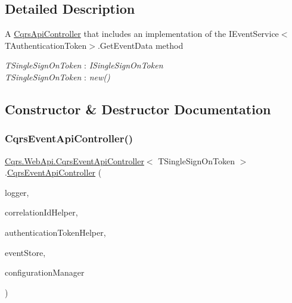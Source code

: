 \subsection{Detailed Description}
A \hyperlink{classCqrs_1_1WebApi_1_1CqrsApiController}{Cqrs\+Api\+Controller} that includes an implementation of the I\+Event\+Service$<$\+T\+Authentication\+Token$>$.\+Get\+Event\+Data method 

\begin{Desc}
\item[Type Constraints]\begin{description}
\item[{\em T\+Single\+Sign\+On\+Token} : {\em I\+Single\+Sign\+On\+Token}]\item[{\em T\+Single\+Sign\+On\+Token} : {\em new()}]\end{description}
\end{Desc}


\subsection{Constructor \& Destructor Documentation}
\mbox{\label{classCqrs_1_1WebApi_1_1CqrsEventApiController_a5f1162d692213363fdcaf898f439f7dd_a5f1162d692213363fdcaf898f439f7dd}} 
\subsubsection{\texorpdfstring{Cqrs\+Event\+Api\+Controller()}{CqrsEventApiController()}}
{\footnotesize\ttfamily \hyperlink{classCqrs_1_1WebApi_1_1CqrsEventApiController}{Cqrs.\+Web\+Api.\+Cqrs\+Event\+Api\+Controller}$<$ T\+Single\+Sign\+On\+Token $>$.\hyperlink{classCqrs_1_1WebApi_1_1CqrsEventApiController}{Cqrs\+Event\+Api\+Controller} (\begin{DoxyParamCaption}\item[{I\+Logger}]{logger,  }\item[{I\+Correlation\+Id\+Helper}]{correlation\+Id\+Helper,  }\item[{\hyperlink{interfaceCqrs_1_1Authentication_1_1IAuthenticationTokenHelper}{I\+Authentication\+Token\+Helper}$<$ T\+Single\+Sign\+On\+Token $>$}]{authentication\+Token\+Helper,  }\item[{\hyperlink{interfaceCqrs_1_1Events_1_1IEventStore}{I\+Event\+Store}$<$ T\+Single\+Sign\+On\+Token $>$}]{event\+Store,  }\item[{\hyperlink{interfaceCqrs_1_1Configuration_1_1IConfigurationManager}{I\+Configuration\+Manager}}]{configuration\+Manager }\end{DoxyParamCaption})\hspace{0.3cm}{\ttfamily [protected]}}




